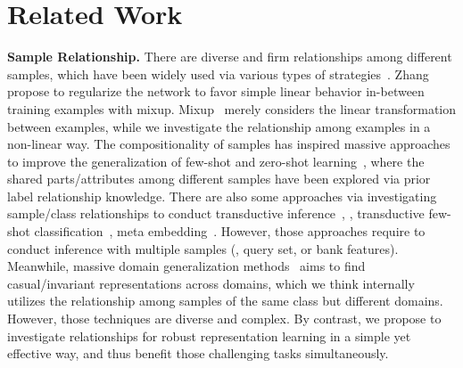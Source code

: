 \documentclass[10pt,twocolumn,letterpaper]{article}
\begin{document}
\section{Related Work}

{\bf Sample Relationship.}
There are diverse and firm relationships among different samples, which have been widely used via various types of strategies~\cite{zhang2018mixup, liu2018learning, hou2019cross, mondal2021mini}. Zhang \etal~\cite{zhang2018mixup} propose to regularize the network to favor simple linear behavior in-between training examples with mixup. Mixup~\cite{zhang2018mixup} merely considers the linear transformation between examples, while we investigate the relationship among examples in a non-linear way. The compositionality of samples has inspired massive approaches to improve the generalization of few-shot and zero-shot learning~\cite{tokmakov2019learning, he2021compas, hou2020visual, naeem2021learning}, where the shared parts/attributes among different samples have been explored via prior label relationship knowledge. There are also some approaches via investigating sample/class relationships to conduct transductive inference~\cite{liu2018learning, hou2019cross, liu2019openlongtailrecognition, mondal2021mini}, \eg, transductive few-shot classification~\cite{liu2018learning}, meta embedding~\cite{liu2019openlongtailrecognition, zhu2020inflated}. However, those approaches require to conduct inference with multiple samples (\eg, query set, or bank features). Meanwhile, massive domain generalization methods~\cite{peng2019domain, arjovsky2019invariant, huang2020self} aims to find casual/invariant representations across domains, which we think internally utilizes the relationship among samples of the same class but different domains. However, those techniques are diverse and complex. By contrast, we propose to investigate relationships for robust representation learning in a simple yet effective way, and thus benefit those challenging tasks simultaneously.
\end{document}
